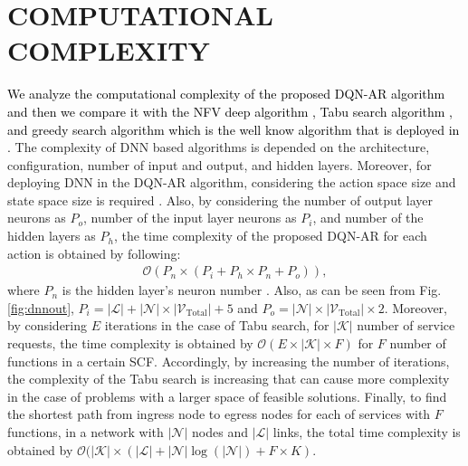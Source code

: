 \documentclass[20pt,twocolumn]{IEEEtran}
\begin{document}
\section{COMPUTATIONAL COMPLEXITY}\label{section_complexity}
\textcolor{black}{
We analyze the computational complexity of the proposed DQN-AR algorithm and then we compare it with the NFV deep algorithm \cite{10.1145/3326285.3329056}, Tabu search algorithm \cite{leivadeas2019vnf}, and greedy search algorithm which is the well know algorithm that is deployed in \cite{sheikhzadeh2021ai, li2020cost ,agarwal2018joint}.} The complexity of DNN based algorithms is depended on the architecture, configuration, number  of input and output, and hidden layers. Moreover, for deploying DNN in the DQN-AR algorithm,  considering the action space size and state space size is required \cite{10.1145/3326285.3329056}. Also, by considering the number of output layer neurons as $P_o$, number of the input layer neurons as $P_i$, and number of the hidden layers as $P_h$, the time complexity of the proposed DQN-AR for each action is obtained by following:
\begin{align}
\mathcal{O}(P_n\times (P_i+ P_h \times P_n + P_o)),
\end{align} 
where $P_n$ is the hidden layer's neuron number \cite{pei2019optimal}. Also, as can be seen from Fig. \ref{fig:dnnout}, $P_{i}=|\mathcal{L}|+|\mathcal{N}|\times|\mathcal{V}_{\text{Total}}|+5$ and $P_o=|\mathcal{N}|\times|\mathcal{V}_{\text{Total}}|\times2$.
Moreover, by considering $E$ iterations in the case of Tabu search, for $|\mathcal{K}|$ number of service requests, the time complexity is obtained by $\mathcal{O}(E\times |\mathcal{K}|\times F)$ for $F$ number of functions in a certain SCF.
Accordingly, by increasing the number of iterations, the complexity of the Tabu search is increasing that can cause more complexity in the case of problems with a larger space of feasible solutions.
Finally, to find the shortest path from ingress node to egress nodes for each of services with $F$ functions, in a network with $|\mathcal{N}|$ nodes  and $|\mathcal{L}|$ links, the total time complexity is  obtained by $\mathcal{O}(|\mathcal{K}|\times(|\mathcal{L}| + |\mathcal{N}|\log(|\mathcal{N}|)+ F\times K)$.%
\end{document}
